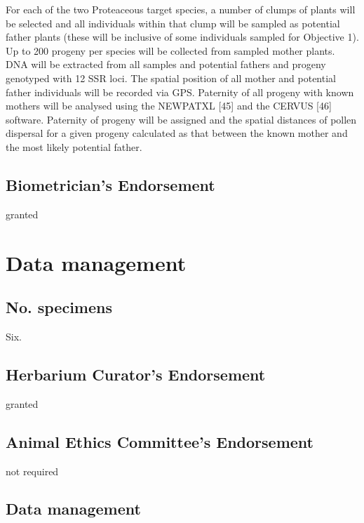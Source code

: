 \documentclass[version=last,
    paper=a4,                               %
    10pt,                                   %
    dvipsnames,
    oneside,                              %
    headings=openany,                       %
    open=any,
    BCOR=7mm,                               %
    DIV=15,     %
]{scrbook}
\begin{document}
For each of the two Proteaceous target species, a number of clumps of
plants will be selected and all individuals within that clump will be
sampled as potential father plants (these will be inclusive of some
individuals sampled for Objective 1). Up to 200 progeny per species will
be collected from sampled mother plants. DNA will be extracted from all
samples and potential fathers and progeny genotyped with 12 SSR loci.
The spatial position of all mother and potential father individuals will
be recorded via GPS. Paternity of all progeny with known mothers will be
analysed using the NEWPATXL {[}45{]} and the CERVUS {[}46{]} software.
Paternity of progeny will be assigned and the spatial distances of
pollen dispersal for a given progeny calculated as that between the
known mother and the most likely potential father.




\subsection*{Biometrician's Endorsement}

granted



\section*{Data management}


\subsection*{No. specimens}

Six.




\subsection*{Herbarium Curator's Endorsement}

granted




\subsection*{Animal Ethics Committee's Endorsement}

not required




\subsection*{Data management}
\end{document}
